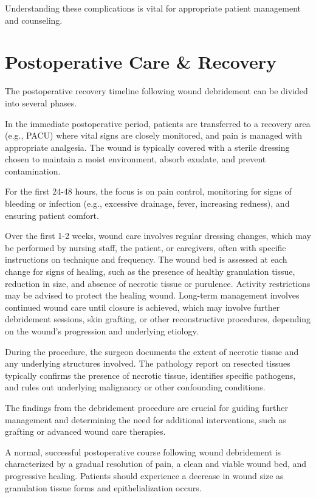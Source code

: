 Understanding these complications is vital for appropriate patient management and counseling.

\section*{Postoperative Care \& Recovery}
The postoperative recovery timeline following wound debridement can be divided into several phases. 

In the immediate postoperative period, patients are transferred to a recovery area (e.g., PACU) where vital signs are closely monitored, and pain is managed with appropriate analgesia. The wound is typically covered with a sterile dressing chosen to maintain a moist environment, absorb exudate, and prevent contamination. 

For the first 24-48 hours, the focus is on pain control, monitoring for signs of bleeding or infection (e.g., excessive drainage, fever, increasing redness), and ensuring patient comfort. 

Over the first 1-2 weeks, wound care involves regular dressing changes, which may be performed by nursing staff, the patient, or caregivers, often with specific instructions on technique and frequency. The wound bed is assessed at each change for signs of healing, such as the presence of healthy granulation tissue, reduction in size, and absence of necrotic tissue or purulence. Activity restrictions may be advised to protect the healing wound. Long-term management involves continued wound care until closure is achieved, which may involve further debridement sessions, skin grafting, or other reconstructive procedures, depending on the wound's progression and underlying etiology.

During the procedure, the surgeon documents the extent of necrotic tissue and any underlying structures involved. The pathology report on resected tissues typically confirms the presence of necrotic tissue, identifies specific pathogens, and rules out underlying malignancy or other confounding conditions. 

The findings from the debridement procedure are crucial for guiding further management and determining the need for additional interventions, such as grafting or advanced wound care therapies.

A normal, successful postoperative course following wound debridement is characterized by a gradual resolution of pain, a clean and viable wound bed, and progressive healing. Patients should experience a decrease in wound size as granulation tissue forms and epithelialization occurs. 

